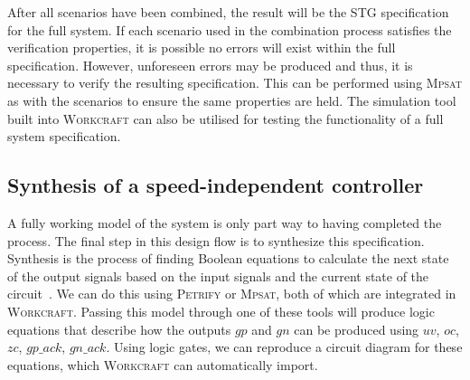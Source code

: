 \documentclass[british,compsoc]{IEEEtran}
\newcommand{\noun}[1]{\textsc{#1}}
\begin{document}
After all scenarios have been combined, the result will be the STG specification
for the full system. If each scenario used in the combination process satisfies
the verification properties, it is possible no errors will exist within the full
specification. However,  unforeseen errors may be produced
and thus, it is necessary to verify the resulting specification. This can
be performed using \noun{Mpsat} as with the scenarios to ensure the same
properties are held. The simulation tool built into \noun{Workcraft} can also
be utilised for testing the functionality of a full system specification.

%
%


\subsection{Synthesis of a speed-independent controller}


A fully working model of the system is only part way to having completed
the process. The final step in this design flow is to synthesize this
specification. Synthesis is the process of finding Boolean equations to calculate
the next state of the output signals based on the input signals and
the current state of the circuit~\cite{Cortadella}. We can do this
using \noun{Petrify} or \noun{Mpsat}, both of which are integrated
in \noun{Workcraft}. Passing this model through one of these tools
will produce logic equations that describe how the outputs $gp$ and
$gn$ can be produced using $uv$, $oc$, $zc$, $gp\_ack$, $gn\_ack$.
Using logic gates, we can reproduce a circuit diagram for these equations, which \noun{Workcraft} can automatically import.
\end{document}
